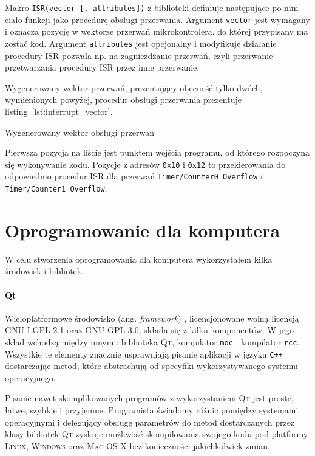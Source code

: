 Makro \texttt{ISR(vector [, attributes])} z biblioteki  definiuje następujące po nim ciało funkcji jako procedurę obsługi przerwania. Argument \texttt{vector} jest wymagany i oznacza pozycję w wektorze przerwań mikrokontrolera, do której przypisany ma zostać kod. Argument \texttt{attributes} jest opcjonalny i modyfikuje działanie procedury ISR \ppauza pozwala np. na zagnieżdżanie przerwań, czyli przerwanie przetwarzania procedury ISR przez inne przerwanie.

Wygenerowany wektor przerwań, prezentujący obecność tylko dwóch, wymienionych powyżej, procedur obsługi przerwania prezentuje listing~\ref{lst:interrupt_vector}.

\begin{listing}
  
  \caption[Wektor obsługi przerwań]{Wygenerowany wektor obsługi przerwań}
  \label{lst:interrupt_vector}
\end{listing}

Pierwsza pozycja na liście jest punktem wejścia programu, od którego rozpoczyna się wykonywanie kodu. Pozycje z adresów \texttt{0x10} i \texttt{0x12} to przekierowania do odpowiednio procedur ISR dla przerwań \texttt{Timer/Counter0 Overflow} i \texttt{Timer/Counter1 Overflow}.

\section{Oprogramowanie dla komputera}
W celu stworzenia oprogramowania dla komputera wykorzystałem kilka środowisk i bibliotek.

\paragraph{Qt}
Wieloplatformowe środowisko (ang. \textsl{framework}) , licencjonowane wolną licencją \textsc{GNU LGPL 2.1} oraz \textsc{GNU GPL 3.0}, składa się z kilku komponentów. W jego skład wchodzą między innymi: biblioteka \textsc{Qt}, kompilator \verb|moc| i kompilator \verb|rcc|. Wszystkie te elementy znacznie usprawniają pisanie aplikacji w języku \verb|C++| dostarczając metod, które abstrachują od specyfiki wykorzystywanego systemu operacyjnego.

Pisanie nawet skomplikowanych programów z wykorzystaniem \textsc{Qt} jest proste, łatwe, szybkie i przyjemne. Programista świadomy różnic pomiędzy systemami operacyjnymi i delegujący obsługę parametrów do metod dostarczanych przez klasy bibliotek \textsc{Qt} zyskuje możliwość skompilowania swojego kodu pod platformy \textsc{Linux}, \textsc{Windows} oraz \textsc{Mac OS X} bez konieczności jakichkolwiek zmian.

